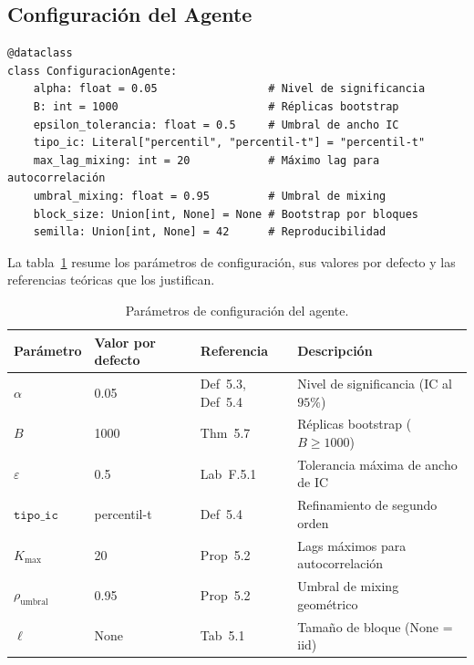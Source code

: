 \documentclass[12pt,a4paper]{article}
\begin{document}
\subsection{Configuración del Agente}

\begin{lstlisting}[caption={ConfiguracionAgente -- Parámetros globales del sistema}]
@dataclass
class ConfiguracionAgente:
    alpha: float = 0.05                 # Nivel de significancia
    B: int = 1000                       # Réplicas bootstrap
    epsilon_tolerancia: float = 0.5     # Umbral de ancho IC
    tipo_ic: Literal["percentil", "percentil-t"] = "percentil-t"
    max_lag_mixing: int = 20            # Máximo lag para autocorrelación
    umbral_mixing: float = 0.95         # Umbral de mixing
    block_size: Union[int, None] = None # Bootstrap por bloques
    semilla: Union[int, None] = 42      # Reproducibilidad
\end{lstlisting}

\medskip

La tabla~\ref{tab:config} resume los parámetros de configuración, sus valores por defecto y las referencias teóricas que los justifican.

\begin{table}[h]
	\centering
	\caption{Parámetros de configuración del agente.}
	\label{tab:config}
	\begin{tabular}{@{}llll@{}}
		\toprule
		Parámetro              & Valor por defecto & Referencia       & Descripción                           \\
		\midrule
		$\alpha$               & 0.05              & Def~5.3, Def~5.4 & Nivel de significancia (IC al $95\%$) \\
		$B$                    & 1000              & Thm~5.7          & Réplicas bootstrap ($B \geq 1000$)    \\
		$\varepsilon$          & 0.5               & Lab~F.5.1        & Tolerancia máxima de ancho de IC      \\
		$\texttt{tipo\_ic}$    & percentil-t       & Def~5.4          & Refinamiento de segundo orden         \\
		$K_{\max}$             & 20                & Prop~5.2         & Lags máximos para autocorrelación     \\
		$\rho_{\text{umbral}}$ & 0.95              & Prop~5.2         & Umbral de mixing geométrico           \\
		$\ell$                 & None              & Tab~5.1          & Tamaño de bloque (None = iid)         \\
		\bottomrule
	\end{tabular}
\end{table}
\end{document}
